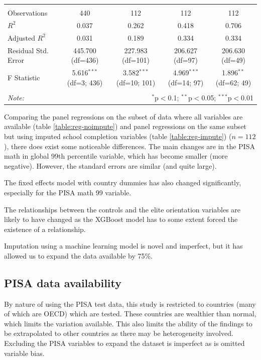 \documentclass[11pt]{article}
\begin{document}
\begin{table}[!htbp]
{\begin{tabular}{@{\extracolsep{5pt}}lcccc}
    \hline \\[-1.8ex]
     Observations & 440 & 112 & 112 & 112 \\
     $R^2$ & 0.037 & 0.262 & 0.418 & 0.706 \\
     Adjusted $R^2$ & 0.031 & 0.189 & 0.334 & 0.334 \\
     Residual Std. Error & 445.700 (df=436) & 227.983 (df=101) & 206.627 (df=97) & 206.630 (df=49) \\
     F Statistic & 5.616$^{***}$ (df=3; 436) & 3.582$^{***}$ (df=10; 101) & 4.969$^{***}$ (df=14; 97) & 1.896$^{**}$ (df=62; 49) \\
    \hline
    \hline \\[-1.8ex]
    \textit{Note:} & \multicolumn{4}{r}{$^{*}$p$<$0.1; $^{**}$p$<$0.05; $^{***}$p$<$0.01} \\
    \end{tabular}
    }
    \end{table}

Comparing the panel regressions on the subset of data where all variables are available (table \ref{table:reg-noimpute}) and panel regressions on the same subset but using imputed school completion variables (table \ref{table:reg-impute}) ($n=112$), there does exist some noticeable differences. The main changes are in the PISA math in global 99th percentile variable, which has become smaller (more negative). However, the standard errors are similar (and quite large).

The fixed effects model with country dummies has also changed significantly, especially for the PISA math 99 variable.

The relationships between the controls and the elite orientation variables are likely to have changed as the XGBoost model has to some extent forced the existence of a relationship.

Imputation using a machine learning model is novel and imperfect, but it has allowed us to expand the data available by 75\%.

\subsection{PISA data availability}
By nature of using the PISA test data, this study is restricted to countries (many of which are OECD) which are tested. These countries are wealthier than normal, which limits the variation available. This also limits the ability of the findings to be extrapolated to other countries as there may be heterogeneity involved. Excluding the PISA variables to expand the dataset is imperfect as is omitted variable bias.
\end{document}
